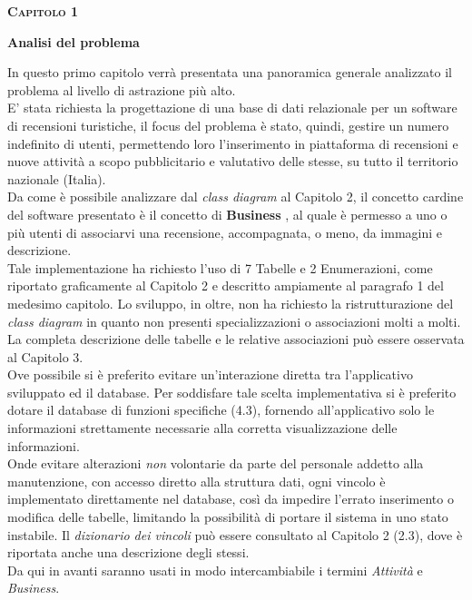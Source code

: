 \documentclass[a4paper,12pt]{article}
\begin{document}
\newpage\null{}\setcounter{page}{5} 
\begin{flushleft}

\vspace*{+1cm}
\Large\textsc{\bf Capitolo 1}
\vspace*{+1cm}

\begingroup
\fontsize{35pt}{12pt}\selectfont\bf{Analisi del problema}
\endgroup
\vspace*{+1cm}
\end{flushleft}

\normalsize{
In questo primo capitolo verrà presentata una panoramica generale analizzato il problema al livello di astrazione più alto.
\vspace*{+0.2cm}
\\E' stata richiesta la progettazione di una base di dati relazionale per un software di recensioni turistiche, il focus del problema è stato, quindi, gestire un numero indefinito di utenti, permettendo loro l'inserimento in piattaforma di recensioni e nuove attività a scopo pubblicitario e valutativo delle stesse, su tutto il territorio nazionale (Italia).
\vspace*{+0.2cm}
\\Da come è possibile analizzare dal {\it class diagram} al Capitolo 2, il concetto cardine del software presentato è il concetto di {\bf Business }, al quale è permesso a uno o più utenti di associarvi una recensione, accompagnata, o meno, da immagini e descrizione.
\vspace*{+0.2cm}
\\Tale implementazione ha richiesto l'uso di 7 Tabelle e 2 Enumerazioni, come riportato graficamente al Capitolo 2 e descritto ampiamente al paragrafo 1 del medesimo capitolo. Lo sviluppo, in oltre, non ha richiesto la ristrutturazione del {\it class diagram} in quanto non presenti specializzazioni o associazioni molti a molti. La completa descrizione delle tabelle e le relative associazioni può essere osservata al Capitolo 3.
\vspace*{+0.2cm}
\\Ove possibile si è preferito evitare un'interazione diretta tra l'applicativo sviluppato ed il database. Per soddisfare tale scelta implementativa si è preferito dotare il database di funzioni specifiche (4.3), fornendo all'applicativo solo le informazioni strettamente necessarie alla corretta visualizzazione delle informazioni.
\vspace*{+0.2cm}
\\Onde evitare alterazioni {\it non} volontarie da parte del personale addetto alla manutenzione, con accesso diretto alla struttura dati, ogni vincolo è implementato direttamente nel database, così da impedire l'errato inserimento o modifica delle tabelle, limitando la possibilità di portare il sistema in uno stato instabile. Il \textit{dizionario dei vincoli} può essere consultato al Capitolo 2 (2.3), dove è riportata anche una descrizione degli stessi.
\vspace*{+0.2cm}
\\Da qui in avanti saranno usati in modo intercambiabile i termini \textit{Attività} e \textit{Business}.
}
\end{document}

